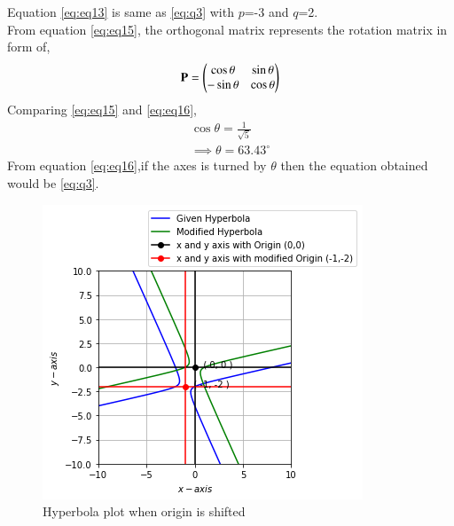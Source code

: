\documentclass[journal,12pt,twocolumn]{IEEEtran}
\begin{document}
Equation \eqref{eq:eq13} is same as \eqref{eq:q3} with $p$=-3 and $q$=2.\\
From equation \eqref{eq:eq15}, the orthogonal matrix represents the rotation matrix in form of,
\begin{align}
    \mathbf{P}=\begin{pmatrix}\cos\theta & \sin\theta\\ -\sin\theta& \cos\theta\end{pmatrix} \label{eq:eq16}
\end{align}
Comparing \eqref{eq:eq15} and \eqref{eq:eq16},
\begin{align}
    \cos\theta = \frac{1}{\sqrt{5}}\\
    \implies \boxed{\theta = 63.43^{\circ}}
\end{align}
From equation \eqref{eq:eq16},if the axes is turned by $\theta$ then the equation obtained would be \eqref{eq:q3}.
\renewcommand{\thefigure}{\arabic{figure}}
\begin{figure}[h!]
	\centering
	\includegraphics[width=\columnwidth]{hyperbola1.png}
	\caption{Hyperbola plot when origin is shifted}
	\label{myfig}
\end{figure}
\\
\end{document}
